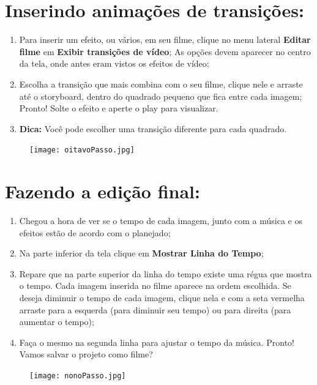 \documentclass{article}
\begin{document}
{\newpage

\section{Inserindo animações de transições:}
\begin{enumerate}
\item Para inserir um efeito, ou vários, em seu filme, clique no menu lateral \textbf{Editar filme} em \textbf{Exibir transições de vídeo}; As opções devem aparecer no centro da tela, onde antes eram vistos os efeitos de vídeo;
\item Escolha a transição que mais combina com o seu filme, clique nele e arraste até o storyboard, dentro do quadrado pequeno que fica entre cada imagem;
Pronto! Solte o efeito e aperte o play para visualizar.
\item \textbf{Dica:} Você pode escolher uma transição diferente para cada quadrado.
\end{enumerate}

\begin{figure}[h!]
\centering
\texttt{[image: oitavoPasso.jpg]}
\end{figure}

\newpage

\section{Fazendo a edição final:}
\begin{enumerate}
\item Chegou a hora de ver se o tempo de cada imagem, junto com a música e os efeitos estão de acordo com o planejado;
\item Na parte inferior da tela clique em \textbf{Mostrar Linha do Tempo};
\item Repare que na parte superior da linha do tempo existe uma régua que mostra o tempo. Cada imagem inserida no filme aparece na ordem escolhida. Se deseja diminuir o tempo de cada imagem, clique nela e com a seta vermelha arraste para a esquerda (para diminuir seu tempo) ou para direita (para aumentar o tempo);
\item Faça o mesmo na segunda linha para ajustar o tempo da música. Pronto! Vamos salvar o projeto como filme?
\end{enumerate}

\begin{figure}[h!]
\centering
\texttt{[image: nonoPasso.jpg]}
\end{figure}

}
\end{document}
